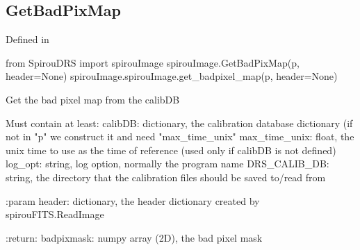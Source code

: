 
\noindent\begin{minipage}{\textwidth}
\subsection{GetBadPixMap}

Defined in \spirouImage{}

\begin{pythonbox}
from SpirouDRS import spirouImage
spirouImage.GetBadPixMap(p, header=None)
spirouImage.spirouImage.get_badpixel_map(p, header=None)
\end{pythonbox}

\begin{pythondocstring}
Get the bad pixel map from the calibDB

    Must contain at least:
            calibDB: dictionary, the calibration database dictionary
                     (if not in "p" we construct it and need "max_time_unix"
            max_time_unix: float, the unix time to use as the time of
                            reference (used only if calibDB is not defined)
            log_opt: string, log option, normally the program name
            DRS_CALIB_DB: string, the directory that the calibration
                          files should be saved to/read from

:param header: dictionary, the header dictionary created by
               spirouFITS.ReadImage

:return: badpixmask: numpy array (2D), the bad pixel mask
\end{pythondocstring}
\end{minipage}


